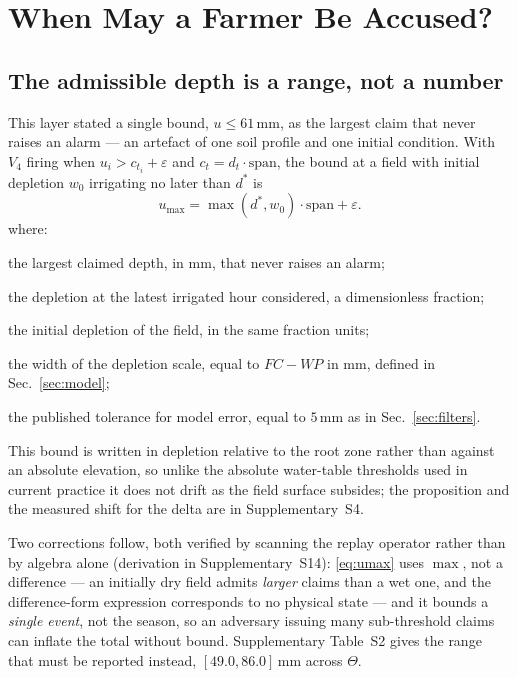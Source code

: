 \section{When May a Farmer Be Accused?}
\label{sec:guarantee}

\subsection{The admissible depth is a range, not a number}
\label{sec:umax}

This layer stated a single bound, $u\le 61$\,mm, as the largest claim that never raises an alarm --- an artefact of one soil profile and one initial condition. With $V_4$ firing when
$u_i>c_{t_i}+\varepsilon$ and $c_t=d_t\cdot\mathrm{span}$, the bound at a
field with initial depletion $w_0$ irrigating no later than $d^{*}$ is
\begin{equation}
u_{\max}=\max(d^{*},w_0)\cdot\mathrm{span}+\varepsilon .
\label{eq:umax}
\end{equation}
where:
\begin{symbolist}
\item[$u_{\max}$] the largest claimed depth, in mm, that never raises an alarm;
\item[$d^{*}$] the depletion at the latest irrigated hour considered, a dimensionless fraction;
\item[$w_0$] the initial depletion of the field, in the same fraction units;
\item[$\mathrm{span}$] the width of the depletion scale, equal to $FC-WP$ in mm, defined in Sec.~\ref{sec:model};
\item[$\varepsilon$] the published tolerance for model error, equal to $5$\,mm as in Sec.~\ref{sec:filters}.
\end{symbolist}

This bound is written in depletion relative to the root zone rather than against
an absolute elevation, so unlike the absolute water-table thresholds used in current
practice it does not drift as the field surface subsides; the proposition and the
measured shift for the delta are in Supplementary~S4.

Two corrections follow, both verified by scanning the replay operator rather
than by algebra alone (derivation in Supplementary~S14): \eqref{eq:umax} uses
$\max$, not a difference --- an initially dry field admits \emph{larger}
claims than a wet one, and the difference-form expression corresponds to
no physical state --- and it bounds a \emph{single event}, not the season, so
an adversary issuing many sub-threshold claims can inflate the total without
bound. Supplementary Table~S2 gives the range that must be reported instead,
$[49.0,86.0]$\,mm across $\Theta$.

